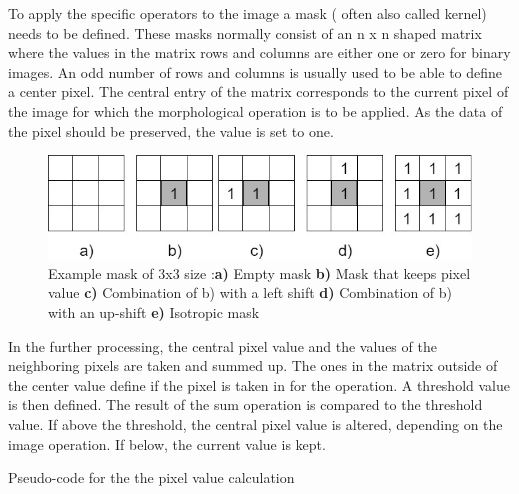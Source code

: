 To apply the specific operators to the image a mask ( often also called kernel) needs to be defined. These masks normally consist of an n x n shaped matrix where the values in the matrix rows and columns are either one or zero for binary images. An odd number of rows and columns is usually used to be able to define a center pixel. The central entry of the matrix corresponds to the current pixel of the image for which the morphological operation is to be applied. As the data of the pixel should be preserved, the value is set to one. 
\begin{figure}[H]
\includegraphics[width=\textwidth]{images/morpological_kernels.jpg}
\caption{ Example mask of 3x3 size :\textbf{a)} Empty mask \textbf{b)} Mask that keeps pixel value  \textbf{c)} Combination of b) with a left shift   \textbf{d)} Combination of b) with an up-shift   \textbf{e)} Isotropic mask}
\label{morphological_ops} 
\end{figure}
In the further processing, the central pixel value and the values of the neighboring pixels are taken and summed up. The ones in the matrix outside of the center value define if the pixel is taken in for the operation. A threshold value is then defined. The result of the sum operation is compared to the threshold value. If above the threshold, the central pixel value is altered, depending on the image operation. If below, the current value is kept.
\begin{algorithm}
\SetAlgoLined
{}
\BlankLine
{}
\BlankLine
{}
\If{\Result $>=$ \Threshold}{\CentVal$=$ \OpVal}
\caption{Pseudo-code for the the pixel value calculation}
\label{mask_calc_pseudocode}
\end{algorithm}
